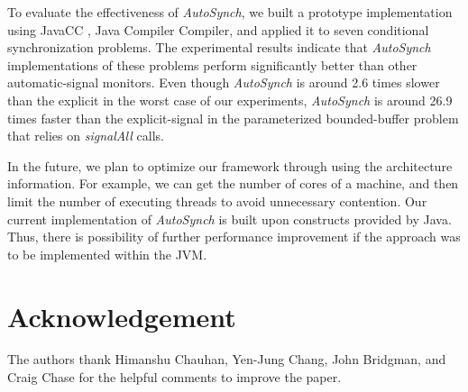 \documentclass{sigplanconf}
\begin{document}
To evaluate the effectiveness of {\em AutoSynch}, we built a prototype implementation
using JavaCC \cite{kod04}, Java Compiler Compiler,  and applied it to seven 
conditional synchronization problems. The experimental results indicate that 
{\em AutoSynch} implementations of these problems perform significantly better than
other automatic-signal monitors. Even though {\em AutoSynch} is around 2.6 times 
slower than the explicit in the worst case of our experiments, {\em AutoSynch} is
around 26.9 times faster than the explicit-signal in the parameterized 
bounded-buffer problem that relies on {\em signalAll} calls. 

In the future, we plan to optimize our framework through using the architecture
information. For example, we can get the number of cores of a machine, and
then limit the number of executing threads to avoid unnecessary contention. Our 
current implementation of {\em AutoSynch} is built upon constructs provided 
by Java. Thus, there is possibility of further performance improvement if the 
approach was to be implemented within the JVM. 

\section*{Acknowledgement}
The authors thank Himanshu Chauhan, Yen-Jung Chang, John Bridgman, and Craig 
Chase for the helpful comments to improve the paper. 
\end{document}
